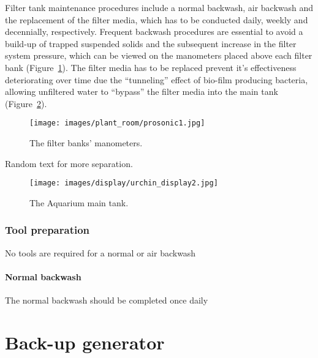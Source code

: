 \documentclass[
  letterpaper,
  DIV=11,
  numbers=noendperiod]{scrreprt}
\begin{document}
Filter tank maintenance procedures include a normal backwash, air
backwash and the replacement of the filter media, which has to be
conducted daily, weekly and decennially, respectively. Frequent backwash
procedures are essential to avoid a build-up of trapped suspended solids
and the subsequent increase in the filter system pressure, which can be
viewed on the manometers placed above each filter bank
(Figure~\ref{fig-fb-manometer}). The filter media has to be replaced
prevent it's effectiveness deteriorating over time due the ``tunneling''
effect of bio-film producing bacteria, allowing unfiltered water to
``bypass'' the filter media into the main tank
(Figure~\ref{fig-main-tank}).

\begin{figure}[H]

{\centering \texttt{[image: images/plant\_room/prosonic1.jpg]}

}

\caption{\label{fig-fb-manometer}The filter banks' manometers.}

\end{figure}

Random text for more separation.

\begin{figure}[H]

{\centering \texttt{[image: images/display/urchin\_display2.jpg]}

}

\caption{\label{fig-main-tank}The Aquarium main tank.}

\end{figure}

\hypertarget{sec-ft-tool-prep}{%
\subsection{Tool preparation}\label{sec-ft-tool-prep}}

{No tools are required for a normal or air backwash}

\hypertarget{normal-backwash}{%
\subsubsection{Normal backwash}\label{normal-backwash}}

{The normal backwash should be completed once daily}

\hypertarget{back-up-generator}{%
\chapter{Back-up generator}\label{back-up-generator}}
\end{document}
